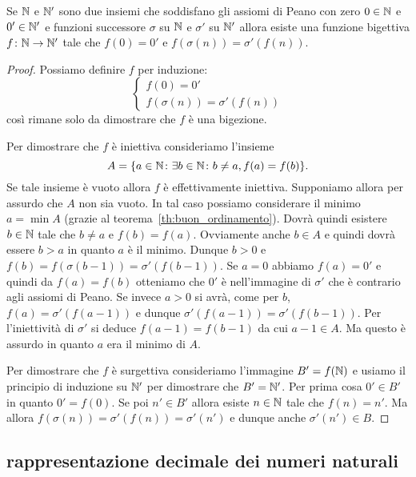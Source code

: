 \begin{theorem}
  \label{th:unicitaN}%
  Se ${\mathbb N}$ e ${\mathbb N}'$ sono due insiemi che soddisfano gli assiomi di Peano 
  con zero $0\in {\mathbb N}$ e $0'\in {\mathbb N}'$ e funzioni 
  successore $\sigma$ su ${\mathbb N}$ e $\sigma'$ su ${\mathbb N}'$ allora
  esiste una funzione bigettiva $f\colon {\mathbb N}\to {\mathbb N}'$ tale che 
  $f(0) = 0'$ e $f(\sigma(n)) = \sigma'(f(n))$.
\end{theorem}
%
\begin{proof}
Possiamo definire $f$ per induzione:
\[
\begin{cases}
  f(0) = 0' \\ 
  f(\sigma(n)) = \sigma'(f(n))
\end{cases}  
\]
così rimane solo da dimostrare che $f$ è una bigezione.

Per dimostrare che $f$ è iniettiva consideriamo l'insieme 
\[
  A={\left\{ a\in {\mathbb N}\colon \exists b\in {\mathbb N}\colon b\neq a, f(a)=f(b) \right\}}.
\]
Se tale insieme è vuoto allora $f$ è effettivamente iniettiva.
Supponiamo allora per assurdo che $A$ non sia vuoto.
In tal caso possiamo considerare il minimo $a=\min A$ 
(grazie al teorema~\ref{th:buon_ordinamento}).
Dovrà quindi esistere $b\in {\mathbb N}$ tale che $b\neq a$ e $f(b)=f(a)$.
Ovviamente anche $b\in A$ e quindi dovrà essere $b>a$ in quanto
$a$ è il minimo. Dunque $b>0$ e $f(b) = f(\sigma(b-1))
=\sigma'(f(b-1))$. Se $a=0$ abbiamo $f(a)=0'$ e quindi da $f(a)=f(b)$ 
otteniamo che $0'$ è nell'immagine di $\sigma'$ che è contrario 
agli assiomi di Peano. 
Se invece $a>0$ si avrà, come per $b$,
$f(a)=\sigma'(f(a-1))$ e dunque $\sigma'(f(a-1)) = \sigma'(f(b-1))$.
Per l'iniettività di $\sigma'$ si deduce $f(a-1)=f(b-1)$ da cui 
$a-1 \in A$. Ma questo è assurdo in quanto $a$ era il minimo di $A$.

Per dimostrare che $f$ è surgettiva consideriamo l'immagine 
$B'=f({\mathbb N})$ e usiamo il principio di induzione su ${\mathbb N}'$ 
per dimostrare che $B'={\mathbb N}'$.
Per prima cosa $0'\in B'$ in quanto $0'=f(0)$.
Se poi $n'\in B'$ allora esiste $n\in {\mathbb N}$ tale che $f(n)=n'$.
Ma allora $f(\sigma(n))=\sigma'(f(n))=\sigma'(n')$ 
e dunque anche $\sigma'(n')\in B$. 
\end{proof}

\subsection{rappresentazione decimale dei numeri naturali}

